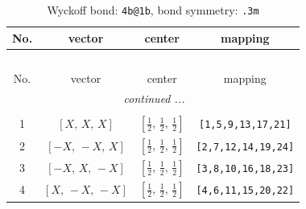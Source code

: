 \documentclass[fleqn,8pt]{jsarticle}
\begin{document}
\renewcommand{\arraystretch}{1.2}
\begin{longtable}{cccc}
\caption{Wyckoff bond: {\tt 4b@1b}, bond symmetry: {\tt .3m}}
 \\
 \hline \hline
No. & vector & center & mapping \\ \hline \endfirsthead

\multicolumn{3}{l}{\tablename\ \thetable{}} \\
 \hline \hline
No. & vector & center & mapping \\ \hline \endhead

 \hline \hline
\multicolumn{3}{r}{\footnotesize\it continued ...} \\ \endfoot

 \hline \hline
\multicolumn{3}{r}{} \\ \endlastfoot

1 & $\left[ X,\, X,\, X \right]$ & $\left[ \frac{1}{2},\, \frac{1}{2},\, \frac{1}{2} \right]$ & {\tt [1,5,9,13,17,21]} \\ \hline
2 & $\left[ - X,\, - X,\, X \right]$ & $\left[ \frac{1}{2},\, \frac{1}{2},\, \frac{1}{2} \right]$ & {\tt [2,7,12,14,19,24]} \\ \hline
3 & $\left[ - X,\, X,\, - X \right]$ & $\left[ \frac{1}{2},\, \frac{1}{2},\, \frac{1}{2} \right]$ & {\tt [3,8,10,16,18,23]} \\ \hline
4 & $\left[ X,\, - X,\, - X \right]$ & $\left[ \frac{1}{2},\, \frac{1}{2},\, \frac{1}{2} \right]$ & {\tt [4,6,11,15,20,22]} \\
\end{longtable}
\renewcommand{\arraystretch}{1.2}
\end{document}
